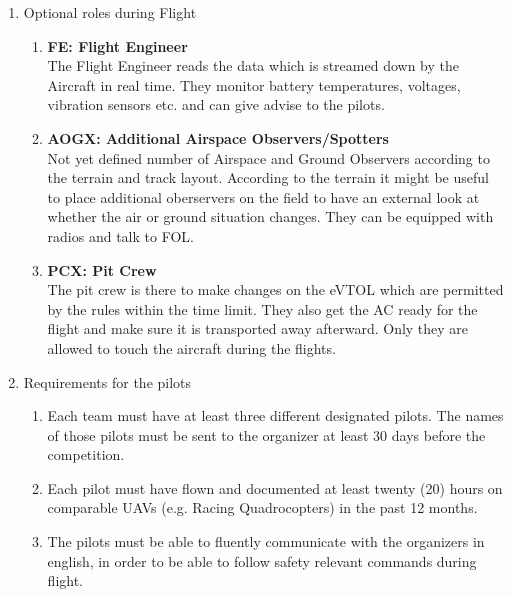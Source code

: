 \begin{enumerate}
    \item{Optional roles during Flight}
    \begin{enumerate}
      \item \textbf{FE: Flight Engineer}\\The Flight Engineer reads the data which is streamed down by the Aircraft in real time. They monitor battery temperatures, voltages, vibration sensors etc. and can give advise to the pilots.
      \item \textbf{AOGX: Additional Airspace Observers/Spotters}\\Not yet defined number of Airspace and Ground Observers according to the terrain and track layout.
      According to the terrain it might be useful to place additional oberservers on the field to have an external look at whether the air or ground situation changes. They can be equipped with radios and talk to FOL.
      \item \textbf{PCX: Pit Crew }\\The pit crew is there to make changes on the eVTOL which are permitted by the rules within the time limit. They also get the AC ready for the flight and make sure it is transported away afterward. Only they are allowed to touch the aircraft during the flights. 
    \end{enumerate}

    \item{Requirements for the pilots}
    \begin{enumerate}
      \item Each team must have at least three different designated pilots. The names of those pilots must be sent to the organizer at least 
      30 days before the competition. 
      \item Each pilot must have flown and documented at least twenty (20) hours on comparable UAVs (e.g. Racing Quadrocopters) in the past 12 months.  
      \item The pilots must be able to fluently communicate with the organizers in english, in order to be able to follow safety relevant commands during flight.
    \end{enumerate}



\end{enumerate}
